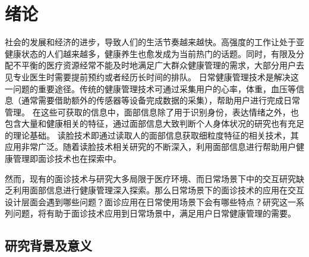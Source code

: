 \chapter{绪论}



社会的发展和经济的进步，导致人们的生活节奏越来越快。高强度的工作让处于亚健康状态的人们越来越多，健康养生也愈发成为当前热门的话题。同时，有限及分配不平衡的医疗资源经常不能及时地满足广大群众健康管理的需求，大部分用户去见专业医生时需要提前预约或者经历长时间的排队\cite{雷鹏中国医疗资源配置与服务利用现状评价}。
日常健康管理技术是解决这一问题的重要途径。传统的健康管理技术可通过采集用户的心率，体重，血压等信息\cite{Liu2014Computerized, Wang2004An, Shu2007Developing}（通常需要借助额外的传感器等设备完成数据的采集），帮助用户进行完成日常管理。
在这些可获取的信息中，面部信息除了用于识别身份，表达情绪之外，也包含大量和健康相关的特征，通过面部信息大致判断个人身体状况的研究也有充足的理论基础\cite{杨淑芳2002伤寒六经辨证初探, Clifford2006Shortliffe}。
读脸技术即通过读取人的面部信息获取细粒度特征的相关技术，其应用非常广泛。随着读脸技术相关研究的不断深入，利用面部信息进行帮助用户健康管理即面诊技术也在探索中。


然而，现有的面诊技术与研究大多局限于医疗环境、而日常场景下中的交互研究缺乏利用面部信息进行健康管理深入探索。那么日常场景下的面诊技术的应用在交互设计层面会遇到哪些问题？面诊应用在日常使用场景下会有哪些特点？研究这一系列问题，将有助于面诊技术应用到日常场景中，满足用户日常健康管理的需要。


\section{研究背景及意义}

